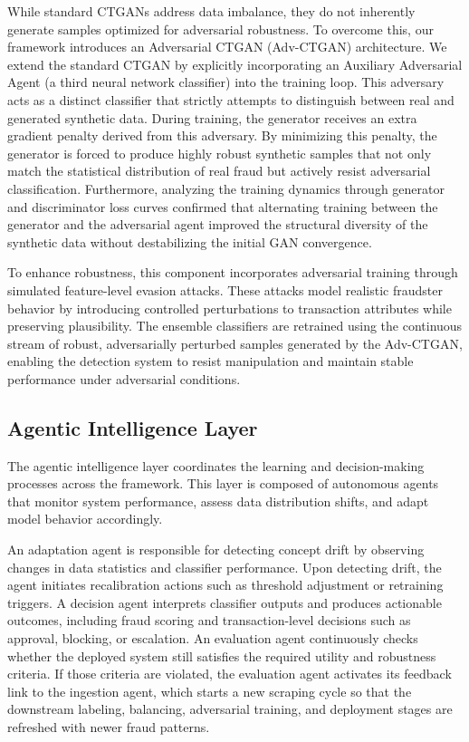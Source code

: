 \documentclass[conference]{IEEEtran}
\begin{document}
While standard CTGANs address data imbalance, they do not inherently generate samples optimized for adversarial robustness. To overcome this, our framework introduces an Adversarial CTGAN (Adv-CTGAN) architecture. We extend the standard CTGAN by explicitly incorporating an Auxiliary Adversarial Agent (a third neural network classifier) into the training loop. This adversary acts as a distinct classifier that strictly attempts to distinguish between real and generated synthetic data. During training, the generator receives an extra gradient penalty derived from this adversary. By minimizing this penalty, the generator is forced to produce highly robust synthetic samples that not only match the statistical distribution of real fraud but actively resist adversarial classification. Furthermore, analyzing the training dynamics through generator and discriminator loss curves confirmed that alternating training between the generator and the adversarial agent improved the structural diversity of the synthetic data without destabilizing the initial GAN convergence.

To enhance robustness, this component incorporates adversarial training through simulated feature-level evasion attacks. These attacks model realistic fraudster behavior by introducing controlled perturbations to transaction attributes while preserving plausibility. The ensemble classifiers are retrained using the continuous stream of robust, adversarially perturbed samples generated by the Adv-CTGAN, enabling the detection system to resist manipulation and maintain stable performance under adversarial conditions.

\subsection{Agentic Intelligence Layer}
The agentic intelligence layer coordinates the learning and decision-making processes across the framework. This layer is composed of autonomous agents that monitor system performance, assess data distribution shifts, and adapt model behavior accordingly.

An adaptation agent is responsible for detecting concept drift by observing changes in data statistics and classifier performance. Upon detecting drift, the agent initiates recalibration actions such as threshold adjustment or retraining triggers. A decision agent interprets classifier outputs and produces actionable outcomes, including fraud scoring and transaction-level decisions such as approval, blocking, or escalation. An evaluation agent continuously checks whether the deployed system still satisfies the required utility and robustness criteria. If those criteria are violated, the evaluation agent activates its feedback link to the ingestion agent, which starts a new scraping cycle so that the downstream labeling, balancing, adversarial training, and deployment stages are refreshed with newer fraud patterns.
\end{document}
